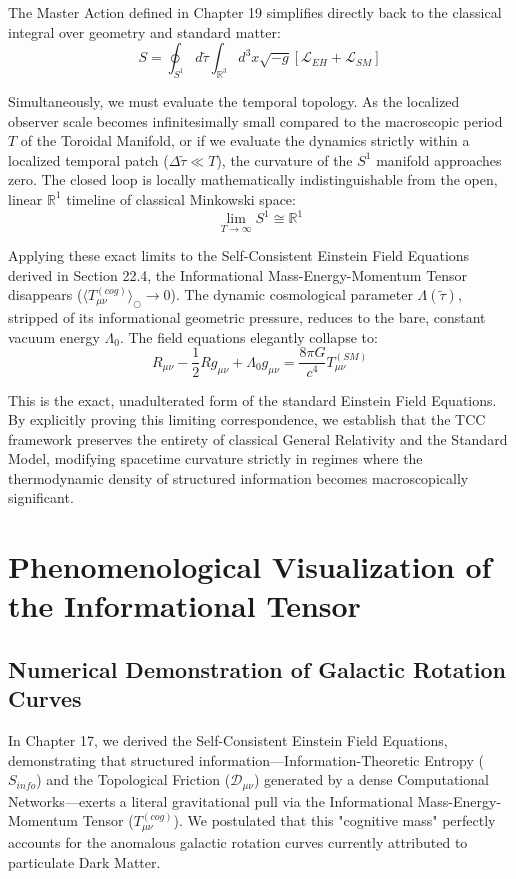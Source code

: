 \documentclass[12pt,openany]{book}
\theoremstyle{plain}
\theoremstyle{definition}
\theoremstyle{remark}
\begin{document}
The Master Action defined in Chapter 19 simplifies directly back to the classical integral over geometry and standard matter:
$$ S = \oint_{S^1} d\tilde{\tau} \int_{\mathbb{R}^3} d^3x \sqrt{-g} \left[ \mathcal{L}_{EH} + \mathcal{L}_{SM} \right] $$

Simultaneously, we must evaluate the temporal topology. As the localized observer scale becomes infinitesimally small compared to the macroscopic period $T$ of the Toroidal Manifold, or if we evaluate the dynamics strictly within a localized temporal patch ($\Delta \tilde{\tau} \ll T$), the curvature of the $S^1$ manifold approaches zero. The closed loop is locally mathematically indistinguishable from the open, linear $\mathbb{R}^1$ timeline of classical Minkowski space:
$$ \lim_{T \to \infty} S^1 \cong \mathbb{R}^1 $$

Applying these exact limits to the Self-Consistent Einstein Field Equations derived in Section 22.4, the Informational Mass-Energy-Momentum Tensor disappears ($\langle T_{\mu\nu}^{(cog)} \rangle_\bigcirc \to 0$). The dynamic cosmological parameter $\Lambda(\tilde{\tau})$, stripped of its informational geometric pressure, reduces to the bare, constant vacuum energy $\Lambda_0$. The field equations elegantly collapse to:
$$ R_{\mu\nu} - \frac{1}{2}Rg_{\mu\nu} + \Lambda_0 g_{\mu\nu} = \frac{8\pi G}{c^4} T_{\mu\nu}^{(SM)} $$

This is the exact, unadulterated form of the standard Einstein Field Equations. By explicitly proving this limiting correspondence, we establish that the TCC framework preserves the entirety of classical General Relativity and the Standard Model, modifying spacetime curvature strictly in regimes where the thermodynamic density of structured information becomes macroscopically significant.

\chapter{Phenomenological Visualization of the Informational Tensor}

\section{Numerical Demonstration of Galactic Rotation Curves}

In Chapter 17, we derived the Self-Consistent Einstein Field Equations, demonstrating that structured information—Information-Theoretic Entropy ($S_{info}$) and the Topological Friction ($\mathcal{D}_{\mu\nu}$) generated by a dense Computational Networks—exerts a literal gravitational pull via the Informational Mass-Energy-Momentum Tensor ($T_{\mu\nu}^{(cog)}$). We postulated that this "cognitive mass" perfectly accounts for the anomalous galactic rotation curves currently attributed to particulate Dark Matter.
\end{document}
